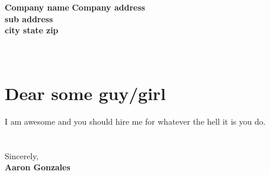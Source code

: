 \documentclass[12pt]{friggeri-cv-coverletter} %
\begin{document}

\textbf{Company name}
\textbf{Company address} \\
\textbf{sub address} \\
\textbf{city state zip} \\
\\
\\

\section{Dear some guy/girl}

I am awesome and you should hire me for whatever the hell it is you do. 
\\
\\
\\
Sincerely, \\
\textbf{Aaron Gonzales}
\end{document}
